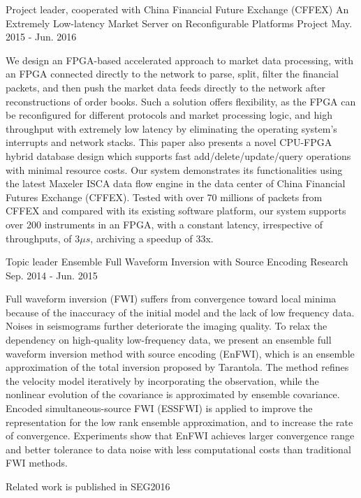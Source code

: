 \documentclass[11pt, a4paper]{awesome-cv}
\begin{document}
\begin{cventries}
  \cventry
    {Project leader, cooperated with China Financial Future Exchange (CFFEX)} %
    {An Extremely Low-latency Market Server on Reconfigurable Platforms} %
    {Project} %
    {May. 2015 - Jun. 2016} %
    {
      \begin{cvitems} %
        \item {We design an FPGA-based accelerated approach to market data processing, with an FPGA connected directly to the network to parse, split, filter the financial packets, and then push the market data feeds directly to the network after reconstructions of order books. Such a solution offers flexibility, as the FPGA can be reconfigured for different protocols and market processing logic, and high throughput with extremely low latency by eliminating the operating system's interrupts and network stacks. This paper also presents a novel CPU-FPGA hybrid database design which supports fast add/delete/update/query operations with minimal resource costs. Our system demonstrates its functionalities using the latest Maxeler ISCA data flow engine in the data center of China Financial Futures Exchange (CFFEX). Tested with over 70 millions of packets from CFFEX and compared with its existing software platform, our system supports over 200 instruments in an FPGA, with a constant latency, irrespective of throughputs, of $3\mu s$, archiving a speedup of 33x.}
      \end{cvitems}
    }

  \cventry
    {Topic leader} %
    {Ensemble Full Waveform Inversion with Source Encoding} %
    {Research} %
    {Sep. 2014 - Jun. 2015} %
    {
      \begin{cvitems} %
        \item {Full waveform inversion (FWI) suffers from convergence toward local minima because of the inaccuracy of the initial model and the lack of low frequency data. Noises in seismograms further deteriorate the imaging quality. To relax the dependency on high-quality low-frequency data, we present an ensemble full waveform inversion method with source encoding (EnFWI), which is an ensemble approximation of the total inversion proposed by Tarantola. The method refines the velocity model iteratively by incorporating the observation, while the nonlinear evolution of the covariance is approximated by ensemble covariance. Encoded simultaneous-source FWI (ESSFWI) is applied to improve the representation for the low rank ensemble approximation, and to increase the rate of convergence. Experiments show that EnFWI achieves larger convergence range and better tolerance to data noise with less computational costs than traditional FWI methods.}
        \item {Related work is published in SEG2016}
      \end{cvitems}
    }


\end{cventries}
\end{document}
